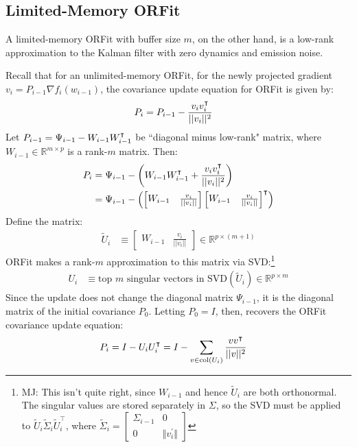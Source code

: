 \subsection{Limited-Memory ORFit}

A limited-memory ORFit with buffer size $m$, on the other hand, is a low-rank approximation to the Kalman filter
with zero dynamics and emission noise. 

Recall that for an unlimited-memory ORFit, for the newly projected gradient $v_i = P_{i-1} \nabla f_i(w_{i-1})$,
the covariance update equation for ORFit is given by:
\begin{align}
    P_i &= P_{i-1} - \frac{v_i v_i^{\intercal}}{||v_i||^{2}}
\end{align}
Let $P_{i-1} = \Psi_{i-1} - W_{i-1}W_{i-1}^{\intercal}$ be ``diagonal minus low-rank" matrix,
where $W_{i-1} \in \mathbb{R}^{m \times p}$ is a rank-$m$ matrix. Then:
\begin{align}
     P_i &= \Psi_{i-1} - \left( W_{i-1}W_{i-1}^{\intercal} + \frac{v_i v_i^{\intercal}}{||v_i||^{2}} \right) \\
     &= \Psi_{i-1} - \left( \begin{bmatrix} W_{i-1} & \frac{v_i}{||v_i||} \end{bmatrix} \begin{bmatrix} W_{i-1} & \frac{v_i}{||v_i||} \end{bmatrix}^{\intercal} \right)
\end{align}
Define the matrix:
\begin{align}
    \tilde{U}_i &\equiv \begin{bmatrix} W_{i-1} & \frac{v_i}{||v_i||} \end{bmatrix} \in \mathbb{R}^{p \times (m+1)}
\end{align}
ORFit makes a rank-$m$ approximation to this matrix via SVD:\footnote{MJ: This isn't quite right, since $W_{i-1}$ and hence $\tilde{U}_i$ are both orthonormal. The singular values are stored separately in $\Sigma$, so the SVD must be applied to $\tilde{U}_i \tilde{\Sigma}_i \tilde{U}_i^{\top}$, where $\tilde{\Sigma}_i = 
\begin{bmatrix} \Sigma_{i-1} & 0 \\ 0 & \Vert v_i^{\prime}\Vert \end{bmatrix}$}
\begin{align}
    U_i &\equiv \text{top }m \text{ singular vectors in SVD}(\tilde{U}_i) \in \mathbb{R}^{p \times m}
\end{align}
Since the update does not change the diagonal matrix $\Psi_{i-1}$, it is the diagonal matrix of the
initial covariance $P_0$. Letting $P_0 = I$, then, recovers the ORFit covariance update equation:
\begin{align}
    P_i &= I - U_i U_i^{\intercal} = I - \sum_{v \in \text{col}(U_i)} \frac{v v^{\intercal}}{||v||^2}
\end{align}

